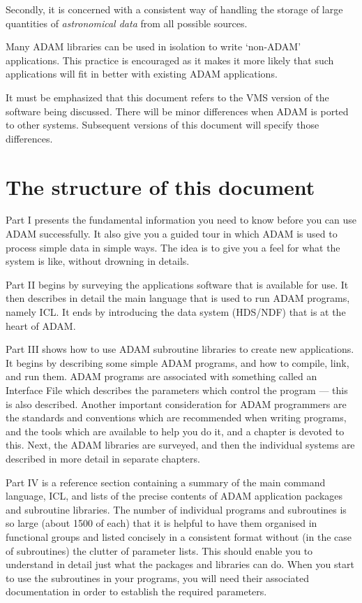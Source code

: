 Secondly, it is concerned with a consistent way of handling the storage of
large quantities of {\em astronomical data} from all possible sources.

Many ADAM libraries can be used in isolation to write `non-ADAM' applications.
This practice is encouraged as it makes it more likely that such applications
will fit in better with existing ADAM applications.

It must be emphasized that this document refers to the VMS version of the
software being discussed.
There will be minor differences when ADAM is ported to other systems.
Subsequent versions of this document will specify those differences. 

\section{The structure of this document}
\label{S_strucdoc}

Part I presents the fundamental information you need to know before you can
use ADAM successfully.
It also give you a guided tour in which ADAM is used to process simple data
in simple ways.
The idea is to give you a feel for what the system is like, without drowning
in details.

Part II begins by surveying the applications software that is available for use.
It then describes in detail the main language that is used to run ADAM programs,
namely ICL.
It ends by introducing the data system (HDS/NDF) that is at the heart of ADAM.

Part III shows how to use ADAM subroutine libraries to create new applications.
It begins by describing some simple ADAM programs, and how to compile, link,
and run them.
ADAM programs are associated with something called an Interface File which
describes the parameters which control the program --- this is also described.
Another important consideration for ADAM programmers are the standards and
conventions which are recommended when writing programs, and the tools which
are available to help you do it, and a chapter is devoted to this.
Next, the ADAM libraries are surveyed, and then the individual systems are
described in more detail in separate chapters.

Part IV is a reference section containing a summary of the main command
language, ICL, and lists of the precise contents of ADAM application packages
and subroutine libraries.
The number of individual programs and subroutines is so large (about 1500 of
each) that it is helpful to have them organised in functional groups and listed
concisely in a consistent format without (in the case of subroutines) the
clutter of parameter lists.
This should enable you to understand in detail just what the packages and
libraries can do.
When you start to use the subroutines in your programs, you will need their
associated documentation in order to establish the required parameters.

